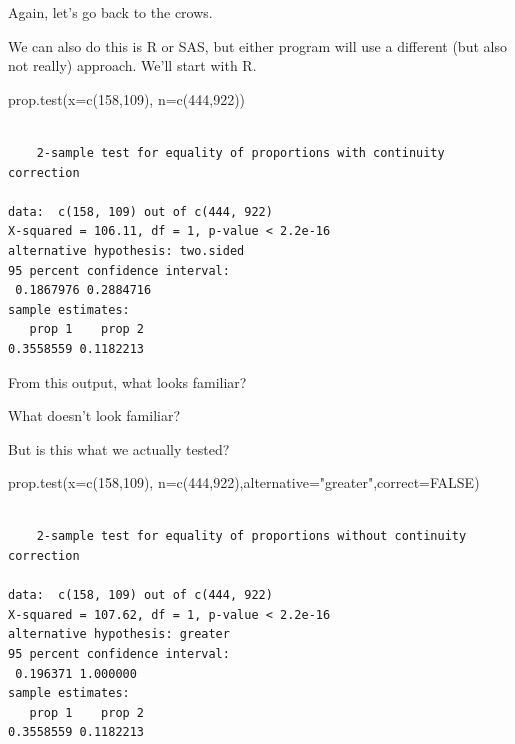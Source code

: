 \documentclass[
  letterpaper,
  DIV=11,
  numbers=noendperiod]{scrartcl}
\newenvironment{Shaded}{\begin{snugshade}}{\end{snugshade}}
\newcommand{\AttributeTok}[1]{\textcolor[rgb]{0.40,0.45,0.13}{#1}}
\newcommand{\ConstantTok}[1]{\textcolor[rgb]{0.56,0.35,0.01}{#1}}
\newcommand{\DecValTok}[1]{\textcolor[rgb]{0.68,0.00,0.00}{#1}}
\newcommand{\FunctionTok}[1]{\textcolor[rgb]{0.28,0.35,0.67}{#1}}
\newcommand{\NormalTok}[1]{\textcolor[rgb]{0.00,0.23,0.31}{#1}}
\newcommand{\StringTok}[1]{\textcolor[rgb]{0.13,0.47,0.30}{#1}}
\begin{document}
Again, let's go back to the crows.

\hfill\break
\hfill\break
\hfill\break
\hfill\break
\hfill\break
\hfill\break
\hfill\break
\hfill\break
\hfill\break
\hfill\break
\hfill\break
\hfill\break

\newpage

We can also do this is R or SAS, but either program will use a different
(but also not really) approach. We'll start with R.

\begin{Shaded}
\begin{Highlighting}[]
\FunctionTok{prop.test}\NormalTok{(}\AttributeTok{x=}\FunctionTok{c}\NormalTok{(}\DecValTok{158}\NormalTok{,}\DecValTok{109}\NormalTok{), }\AttributeTok{n=}\FunctionTok{c}\NormalTok{(}\DecValTok{444}\NormalTok{,}\DecValTok{922}\NormalTok{))}
\end{Highlighting}
\end{Shaded}

\begin{verbatim}

    2-sample test for equality of proportions with continuity correction

data:  c(158, 109) out of c(444, 922)
X-squared = 106.11, df = 1, p-value < 2.2e-16
alternative hypothesis: two.sided
95 percent confidence interval:
 0.1867976 0.2884716
sample estimates:
   prop 1    prop 2 
0.3558559 0.1182213 
\end{verbatim}

From this output, what looks familiar?

\hfill\break

What doesn't look familiar?

\hfill\break
\hfill\break

But is this what we actually tested?

\hfill\break

\begin{Shaded}
\begin{Highlighting}[]
\FunctionTok{prop.test}\NormalTok{(}\AttributeTok{x=}\FunctionTok{c}\NormalTok{(}\DecValTok{158}\NormalTok{,}\DecValTok{109}\NormalTok{), }\AttributeTok{n=}\FunctionTok{c}\NormalTok{(}\DecValTok{444}\NormalTok{,}\DecValTok{922}\NormalTok{),}\AttributeTok{alternative=}\StringTok{"greater"}\NormalTok{,}\AttributeTok{correct=}\ConstantTok{FALSE}\NormalTok{)}
\end{Highlighting}
\end{Shaded}

\begin{verbatim}

    2-sample test for equality of proportions without continuity correction

data:  c(158, 109) out of c(444, 922)
X-squared = 107.62, df = 1, p-value < 2.2e-16
alternative hypothesis: greater
95 percent confidence interval:
 0.196371 1.000000
sample estimates:
   prop 1    prop 2 
0.3558559 0.1182213 
\end{verbatim}
\end{document}
